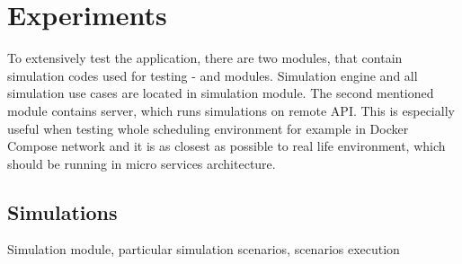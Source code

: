 \chapter{Experiments}\label{ch:experiments}

To extensively test the application,
there are two modules, 
that contain simulation codes used for testing -
 and  modules.
Simulation engine and all simulation use cases are located in simulation module.
The second mentioned module contains server, 
which runs simulations on remote API. 
This is especially useful when testing whole scheduling environment for example in Docker Compose network
and it is as closest as possible to real life environment,
which should be running in micro services architecture.



\section{Simulations}\label{sec:simulations}
Simulation module, particular simulation scenarios, scenarios execution